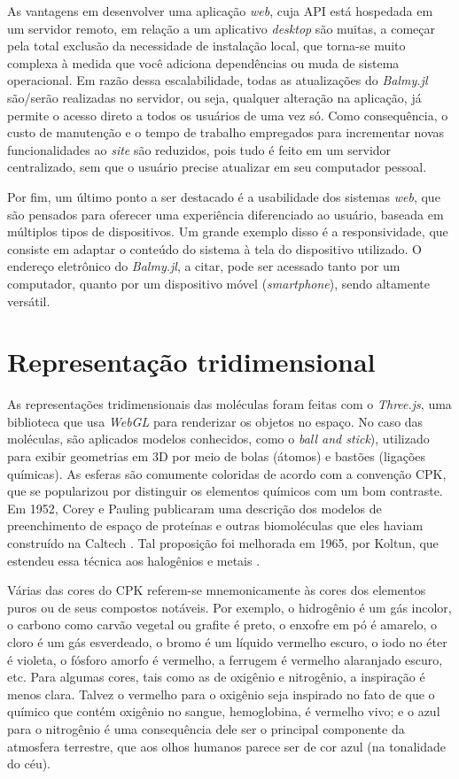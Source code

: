 As vantagens em desenvolver uma aplicação \textit{web}, cuja \gls{API} está hospedada em um servidor remoto, em relação a um aplicativo \textit{desktop} são muitas, a começar pela total exclusão da necessidade de instalação local, que torna-se muito complexa à medida que você adiciona dependências ou muda de sistema operacional. Em razão dessa escalabilidade, todas as atualizações do \textit{Balmy.jl} são/serão realizadas no servidor, ou seja, qualquer alteração na aplicação, já permite o acesso direto a todos os usuários de uma vez só. Como consequência, o custo de manutenção e o tempo de trabalho empregados para incrementar novas funcionalidades ao \textit{site} são reduzidos, pois tudo é feito em um servidor centralizado, sem que o usuário precise atualizar em seu computador pessoal.

Por fim, um último ponto a ser destacado é a usabilidade dos sistemas \textit{web}, que são pensados para oferecer uma experiência diferenciado ao usuário, baseada em múltiplos tipos de dispositivos. Um grande exemplo disso é a responsividade, que consiste em adaptar o conteúdo do sistema à tela do dispositivo utilizado. O endereço eletrônico do \textit{Balmy.jl}, a citar, pode ser acessado tanto por um computador, quanto por um dispositivo móvel (\textit{smartphone}), sendo altamente versátil.



\section{Representação tridimensional}\label{desenhoestrutural}

As representações tridimensionais das moléculas foram feitas com o \textit{Three.js}, uma biblioteca que usa \textit{WebGL} para renderizar os objetos no espaço. No caso das moléculas, são aplicados modelos conhecidos, como o \textit{ball and stick}), utilizado para exibir geometrias em 3D por meio de bolas (átomos) e bastões (ligações químicas). As esferas são comumente coloridas de acordo com a convenção \gls{CPK}, que se popularizou por distinguir os elementos químicos com um bom contraste. Em 1952, Corey e Pauling publicaram uma descrição dos modelos de preenchimento de espaço de proteínas e outras biomoléculas que eles haviam construído na Caltech \autocite{Corey1953}. Tal proposição foi melhorada em 1965, por Koltun, que estendeu essa técnica aos halogênios e metais \autocite{Crossland2004-ll}. 

Várias das cores do \gls{CPK} referem-se mnemonicamente às cores dos elementos puros ou de seus compostos notáveis. Por exemplo, o hidrogênio é um gás incolor, o carbono como carvão vegetal ou grafite é preto, o enxofre em pó é amarelo, o cloro é um gás esverdeado, o bromo é um líquido vermelho escuro, o iodo no éter é violeta, o fósforo amorfo é vermelho, a ferrugem é vermelho alaranjado escuro, etc. Para algumas cores, tais como as de oxigênio e nitrogênio, a inspiração é menos clara. Talvez o vermelho para o oxigênio seja inspirado no fato de que o químico que contém oxigênio no sangue, hemoglobina, é vermelho vivo; e o azul para o nitrogênio é uma consequência dele ser o principal componente da atmosfera terrestre, que aos olhos humanos parece ser de cor azul (na tonalidade do céu).

